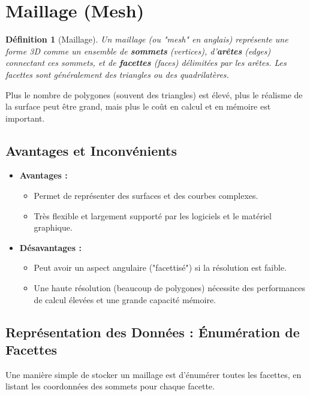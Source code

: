 \documentclass{article}
\newtheorem{definition}{Définition}
\begin{document}
\section{Maillage (Mesh)}

\begin{definition}[Maillage]
Un maillage (ou "mesh" en anglais) représente une forme 3D comme un ensemble de \textbf{sommets} (vertices), d'\textbf{arêtes} (edges) connectant ces sommets, et de \textbf{facettes} (faces) délimitées par les arêtes. Les facettes sont généralement des triangles ou des quadrilatères.
\end{definition}

Plus le nombre de polygones (souvent des triangles) est élevé, plus le réalisme de la surface peut être grand, mais plus le coût en calcul et en mémoire est important.

\subsection{Avantages et Inconvénients}
\begin{itemize}
    \item \textbf{Avantages :}
        \begin{itemize}
            \item Permet de représenter des surfaces et des courbes complexes.
            \item Très flexible et largement supporté par les logiciels et le matériel graphique.
        \end{itemize}
    \item \textbf{Désavantages :}
        \begin{itemize}
            \item Peut avoir un aspect angulaire ("facettisé") si la résolution est faible.
            \item Une haute résolution (beaucoup de polygones) nécessite des performances de calcul élevées et une grande capacité mémoire.
        \end{itemize}
\end{itemize}

\subsection{Représentation des Données : Énumération de Facettes}

Une manière simple de stocker un maillage est d'énumérer toutes les facettes, en listant les coordonnées des sommets pour chaque facette.
\end{document}
